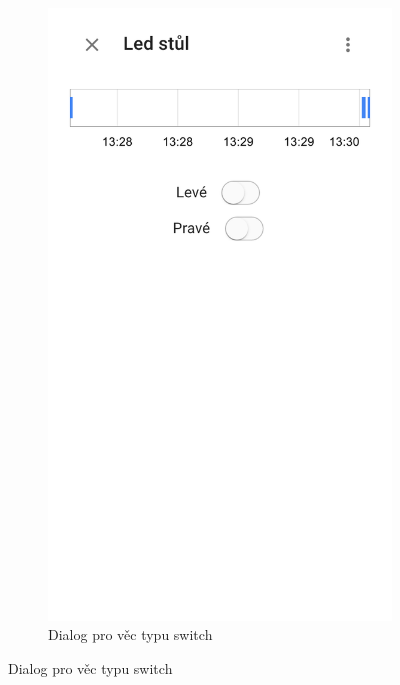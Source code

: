 \documentclass[thesis=B,czech]{FITthesis}[2019/12/23]
\begin{document}
\begin{figure}
    \centering
    \begin{subfigure}{.5\textwidth}
        \centering
        \includegraphics[width=0.75\linewidth]{img/screens/led.png}
        \caption{Dialog pro věc typu switch}
    \end{subfigure}



\end{figure}
\end{document}
